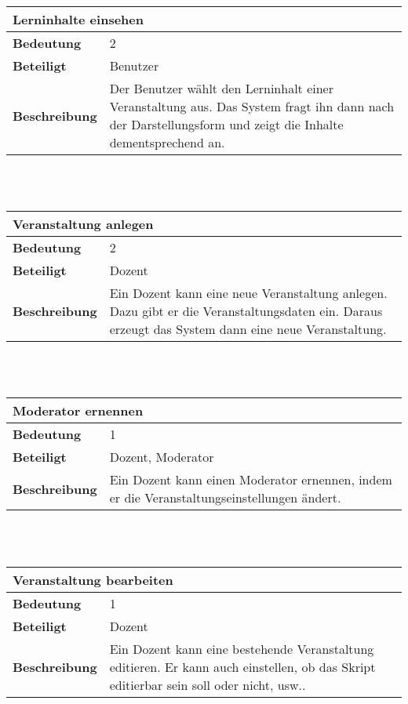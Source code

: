 \documentclass[12pt,a4paper]{article}
\begin{document}
\begin{tabular}{l p{10cm}}
\multicolumn{2}{l}{\textbf{Lerninhalte einsehen}} \\ \hline
\textbf{Bedeutung} & 2 \\ \hline 
\textbf{Beteiligt} & Benutzer \\ \hline 
\textbf{Beschreibung} & Der Benutzer wählt den Lerninhalt einer Veranstaltung aus. Das System fragt ihn dann nach der Darstellungsform und zeigt die Inhalte dementsprechend an. \\ 
\hline 
\end{tabular}\\\\

\begin{tabular}{l p{10cm}}
\multicolumn{2}{l}{\textbf{Veranstaltung anlegen}} \\ \hline
\textbf{Bedeutung} & 2 \\ \hline 
\textbf{Beteiligt} & Dozent \\ \hline 
\textbf{Beschreibung} & Ein Dozent kann eine neue Veranstaltung anlegen. Dazu gibt er die Veranstaltungsdaten ein. Daraus erzeugt das System dann eine neue Veranstaltung.\\ 
\hline 
\end{tabular}\\\\

\begin{tabular}{l p{10cm}}
\multicolumn{2}{l}{\textbf{Moderator ernennen}} \\ \hline
\textbf{Bedeutung} & 1 \\ \hline 
\textbf{Beteiligt} & Dozent, Moderator \\ \hline 
\textbf{Beschreibung} & Ein Dozent kann einen Moderator ernennen, indem er die Veranstaltungseinstellungen ändert.\\ 
\hline 
\end{tabular}\\\\

\begin{tabular}{l p{10cm}}
\multicolumn{2}{l}{\textbf{Veranstaltung bearbeiten}} \\ \hline
\textbf{Bedeutung} & 1 \\ \hline 
\textbf{Beteiligt} & Dozent \\ \hline 
\textbf{Beschreibung} & Ein Dozent kann eine bestehende Veranstaltung editieren. Er kann auch einstellen, ob das Skript editierbar sein soll oder nicht, usw..\\ 
\hline 
\end{tabular}\\\\
\end{document}
